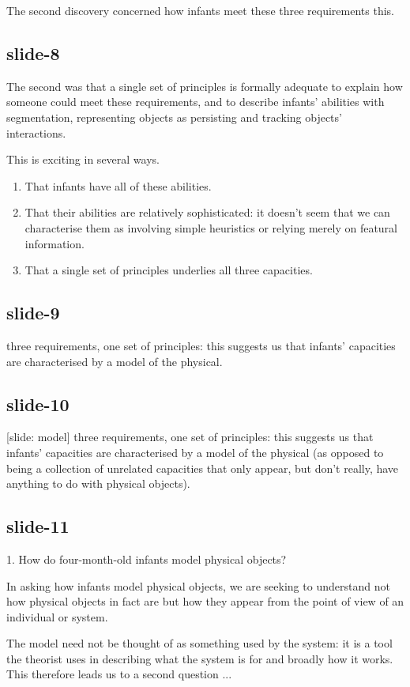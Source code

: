 \documentclass[12pt,\papersize]{extarticle}
\begin{document}
The second discovery concerned how infants meet these three requirements this.

\subsection{slide-8}
The second was that a single set of principles is formally adequate to
explain how someone could meet these requirements, and to describe
infants' abilities with segmentation, representing objects as persisting
and tracking objects' interactions.

This is exciting in several ways.
\begin{enumerate}
\item That infants have all of these abilities.
\item That their abilities are relatively sophisticated: it doesn’t seem
that we can characterise them as involving simple heuristics or relying
merely on featural information.
\item That a single set of principles underlies all three capacities.
\end{enumerate}

\subsection{slide-9}
three requirements, one set of principles: this suggests us that infants’
capacities are characterised by a model of the physical.

\subsection{slide-10}
[slide: model]
three requirements, one set of principles: this suggests us that infants’
capacities are characterised by a model of the physical (as opposed to
being a collection of unrelated capacities that only appear, but don’t
really, have anything to do with physical objects).

\subsection{slide-11}
1. How do four-month-old infants  model  physical objects?

In asking how infants
model physical objects, we are seeking to understand not how physical objects
in fact are but how they appear from the point of view of
an individual or system.

The model need not be thought of as something used by the system: it is
a tool the theorist uses in describing what the system is for and
broadly how it works.
This therefore leads us to a second question ...
\end{document}
